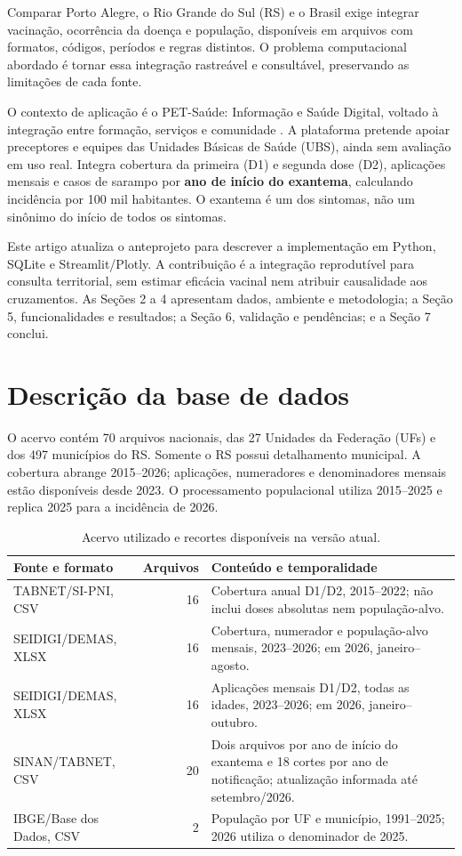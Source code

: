 \documentclass[12pt]{article}
\begin{document}
Comparar Porto Alegre, o Rio Grande do Sul (RS) e o Brasil exige integrar vacinação, ocorrência da doença e população, disponíveis em arquivos com formatos, códigos, períodos e regras distintos. O problema computacional abordado é tornar essa integração rastreável e consultável, preservando as limitações de cada fonte.

O contexto de aplicação é o PET-Saúde: Informação e Saúde Digital, voltado à integração entre formação, serviços e comunidade \cite{petsaude}. A plataforma pretende apoiar preceptores e equipes das Unidades Básicas de Saúde (UBS), ainda sem avaliação em uso real. Integra cobertura da primeira (D1) e segunda dose (D2), aplicações mensais e casos de sarampo por \textbf{ano de início do exantema}, calculando incidência por 100 mil habitantes. O exantema é um dos sintomas, não um sinônimo do início de todos os sintomas.

Este artigo atualiza o anteprojeto para descrever a implementação em Python, SQLite e Streamlit/Plotly. A contribuição é a integração reprodutível para consulta territorial, sem estimar eficácia vacinal nem atribuir causalidade aos cruzamentos. As Seções 2 a 4 apresentam dados, ambiente e metodologia; a Seção 5, funcionalidades e resultados; a Seção 6, validação e pendências; e a Seção 7 conclui.

\section{Descrição da base de dados}
O acervo contém 70 arquivos nacionais, das 27 Unidades da Federação (UFs) e dos 497 municípios do RS. Somente o RS possui detalhamento municipal. A cobertura abrange 2015--2026; aplicações, numeradores e denominadores mensais estão disponíveis desde 2023. O processamento populacional utiliza 2015--2025 e replica 2025 para a incidência de 2026.

\begin{table}[!htbp]
\centering
\caption{Acervo utilizado e recortes disponíveis na versão atual.}
\label{tab:fontes}
\small
\begin{tabularx}{\textwidth}{@{}>{\raggedright\arraybackslash}p{3.1cm}rX@{}}
\toprule
Fonte e formato & Arquivos & Conteúdo e temporalidade \\
\midrule
TABNET/SI-PNI, CSV & 16 & Cobertura anual D1/D2, 2015--2022; não inclui doses absolutas nem população-alvo. \\
SEIDIGI/DEMAS, XLSX & 16 & Cobertura, numerador e população-alvo mensais, 2023--2026; em 2026, janeiro--agosto. \\
SEIDIGI/DEMAS, XLSX & 16 & Aplicações mensais D1/D2, todas as idades, 2023--2026; em 2026, janeiro--outubro. \\
SINAN/TABNET, CSV & 20 & Dois arquivos por ano de início do exantema e 18 cortes por ano de notificação; atualização informada até setembro/2026. \\
IBGE/Base dos Dados, CSV & 2 & População por UF e município, 1991--2025; 2026 utiliza o denominador de 2025. \\
\bottomrule
\end{tabularx}
\end{table}
\end{document}
